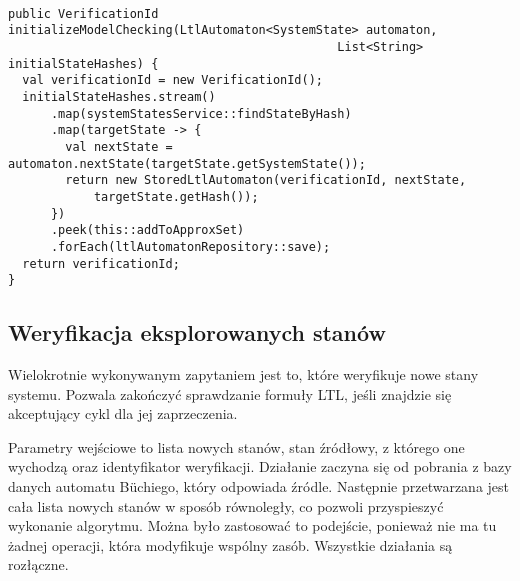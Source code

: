 \begin{minipage}{\linewidth}
\begin{lstlisting}[caption={Kod obsługujący inicjację weryfikacji modelowej.},captionpos=b,label={lst:initializeModelChecking}]

public VerificationId initializeModelChecking(LtlAutomaton<SystemState> automaton,
                                              List<String> initialStateHashes) {
  val verificationId = new VerificationId();
  initialStateHashes.stream()
      .map(systemStatesService::findStateByHash)
      .map(targetState -> {
        val nextState = automaton.nextState(targetState.getSystemState());
        return new StoredLtlAutomaton(verificationId, nextState,
            targetState.getHash());
      })
      .peek(this::addToApproxSet)
      .forEach(ltlAutomatonRepository::save);
  return verificationId;
}

\end{lstlisting}
\end{minipage}


\subsection{Weryfikacja eksplorowanych stanów}

Wielokrotnie wykonywanym zapytaniem jest to, które weryfikuje nowe stany systemu.
Pozwala zakończyć sprawdzanie formuły LTL, jeśli znajdzie się akceptujący cykl dla jej zaprzeczenia.

Parametry wejściowe to lista nowych stanów, stan źródłowy, z którego one wychodzą oraz identyfikator weryfikacji.
Działanie zaczyna się od pobrania z bazy danych automatu Büchiego, który odpowiada źródle.
Następnie przetwarzana jest cała lista nowych stanów w sposób równoległy, co pozwoli przyspieszyć wykonanie algorytmu.
Można było zastosować to podejście, ponieważ nie ma tu żadnej operacji, która modyfikuje wspólny zasób.
Wszystkie działania są rozłączne.

